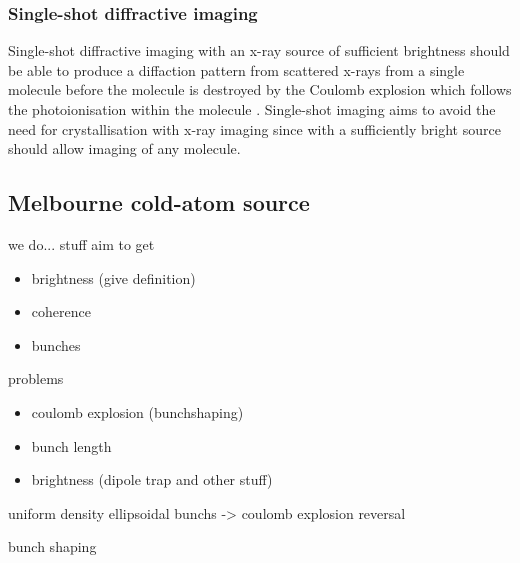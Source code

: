 \subsubsection{Single-shot diffractive imaging}
Single-shot diffractive imaging with an x-ray source of sufficient brightness should be able to produce a diffaction pattern from scattered x-rays from a single molecule before the molecule is destroyed by the Coulomb explosion which follows the photoionisation within the molecule \cite{henderson_potential_1995, neutze_potential_2000}. Single-shot imaging aims to avoid the need for crystallisation with x-ray imaging since with a sufficiently bright source should allow imaging of any molecule.

\subsection{Melbourne cold-atom source}
we do... stuff
aim to get
\begin{itemize}
    \item brightness (give definition)
    \item coherence
    \item bunches
\end{itemize}

problems
\begin{itemize}
    \item coulomb explosion (bunchshaping)
    \item bunch length
    \item brightness (dipole trap and other stuff)
\end{itemize}


uniform density ellipsoidal bunchs -> coulomb explosion reversal\cite{van_der_geer_simulated_2007}

bunch shaping \cite{mcculloch_arbitrarily_2011}


